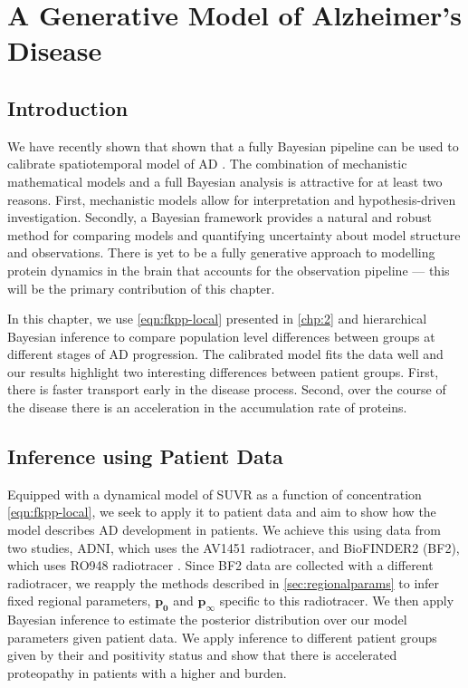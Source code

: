 \chapter{A Generative Model of Alzheimer's Disease}
\label{chp:3}

\section{Introduction}
\label{sec:introduction}

We have recently shown that shown that a fully Bayesian pipeline can be used to
calibrate spatiotemporal model of AD \cite{schafer2021bayesian,
schafer2022correlating}. The combination of mechanistic mathematical models and
a full Bayesian analysis is attractive for at least two reasons. First,
mechanistic models allow for interpretation and hypothesis-driven investigation.
Secondly, a Bayesian framework provides a natural and robust method for
comparing models and quantifying uncertainty about model structure and
observations. There is yet to be a fully generative approach to
modelling \TP protein dynamics in the brain that accounts for the observation pipeline 
--- this will be the primary contribution of this chapter.

In this chapter, we use \cref{eqn:fkpp-local} presented in \cref{chp:2} and
hierarchical Bayesian inference to compare population level differences between
groups at different stages of AD progression. The calibrated model fits the data
well and our results highlight two interesting differences between patient
groups. First, there is faster transport early in the disease process. Second,
over the course of the disease there is an acceleration in the accumulation rate
of proteins.

\section{Inference using Patient Data}
\label{sec:inference}

Equipped with a dynamical model of \TP SUVR as a function of \TP concentration
\cref{eqn:fkpp-local}, we seek to apply it to patient data and aim to show how
the model describes AD development in patients. We achieve this using data from
two studies, ADNI, which uses the AV1451 radiotracer, and BioFINDER2 (BF2),
which uses RO948 radiotracer \cite{leuzy2020diagnostic}. Since BF2 data are
collected with a different radiotracer, we reapply the methods described in
\cref{sec:regionalparams} to infer fixed regional parameters, $\mathbf{p_0}$ and
$\mathbf{p_\infty}$ specific to this radiotracer. We then apply Bayesian
inference to estimate the posterior distribution over our model parameters given
patient data. We apply inference to different patient groups given by their \AB
and \TP positivity status and show that there is accelerated proteopathy in
patients with a higher \AB and \TP burden.

